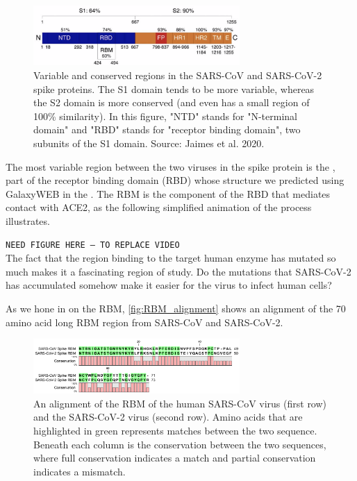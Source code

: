 {{\begin{figure}[h]
	\centering
	\mySfFamily
	\includegraphics[width = 0.7\textwidth]{../images/spike_protein_similarity.png}
	\caption{Variable and conserved regions in the SARS-CoV and SARS-CoV-2 spike proteins. The S1 domain tends to be more variable, whereas the S2 domain is more conserved (and even has a small region of 100\% similarity). In this figure, "NTD" stands for "N-terminal domain" and "RBD" stands for "receptor binding domain", two subunits of the S1 domain. Source: Jaimes et al. 2020.}
	\label{}
\end{figure}

The most variable region between the two viruses in the spike protein is the , part of the receptor binding domain (RBD) whose structure we predicted using GalaxyWEB in the . The RBM is the component of the RBD that mediates contact with ACE2, as the following simplified animation of the process illustrates.

\texttt{NEED FIGURE HERE -- TO REPLACE VIDEO}\\

The fact that the region binding to the target human enzyme has mutated so much makes it a fascinating region of study. Do the mutations that SARS-CoV-2 has accumulated somehow make it easier for the virus to infect human cells?

As we hone in on the RBM, \autoref{fig:RBM_alignment} shows an alignment of the 70 amino acid long RBM region from SARS-CoV and SARS-CoV-2.

\begin{figure}[h]
	\centering
	\mySfFamily
	\includegraphics[width = 0.7\textwidth]{../images/RBM_alignment.png}
	\caption{An alignment of the RBM of the human SARS-CoV virus (first row) and the SARS-CoV-2 virus (second row). Amino acids that are highlighted in green represents matches between the two sequence. Beneath each column is the conservation between the two sequences, where full conservation indicates a match and partial conservation indicates a mismatch.}
	\label{fig:RBM_alignment}
\end{figure}

}}
